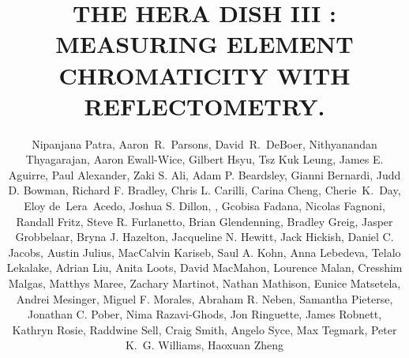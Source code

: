 \documentclass[twocolumn]{emulateapj}
\def\UCB{\altaffilmark{1}}
\def\ASU{\altaffilmark{2}}
\def\myemail{\altaffilmark{$\dagger$}}
\begin{document}
    
    \title{THE HERA DISH III : MEASURING ELEMENT CHROMATICITY WITH REFLECTOMETRY. } 
    
    \author{
    Nipanjana Patra\UCB\myemail,
    Aaron~R.~Parsons\UCB,
    David~R.~DeBoer\UCB,
    Nithyanandan Thyagarajan\ASU,
    Aaron  Ewall-Wice,
    Gilbert Hsyu\UCB, 
    Tsz Kuk Leung\UCB,
    James E. Aguirre, Paul  Alexander, Zaki S. Ali, Adam P. Beardsley, Gianni  Bernardi, Judd D. Bowman, Richard F. Bradley, Chris L. Carilli, Carina  Cheng, Cherie~K.~Day\UCB, Eloy  de~Lera~Acedo, Joshua S. Dillon, , Gcobisa  Fadana, Nicolas  Fagnoni, Randall  Fritz, Steve R. Furlanetto, Brian  Glendenning, Bradley  Greig, Jasper  Grobbelaar, Bryna J. Hazelton, Jacqueline N. Hewitt, Jack  Hickish, Daniel C. Jacobs, Austin  Julius, MacCalvin  Kariseb, Saul A. Kohn, Anna Lebedeva\UCB, Telalo  Lekalake, Adrian  Liu, Anita  Loots, David  MacMahon, Lourence  Malan, Cresshim  Malgas, Matthys  Maree, Zachary  Martinot, Nathan  Mathison, Eunice  Matsetela, Andrei  Mesinger, Miguel F. Morales, Abraham R. Neben,  Samantha  Pieterse, Jonathan C. Pober, Nima  Razavi-Ghods, Jon  Ringuette, James  Robnett, Kathryn  Rosie, Raddwine  Sell, Craig  Smith, Angelo  Syce, Max  Tegmark, Peter K.~G. Williams, Haoxuan  Zheng
    }
    
\end{document}
